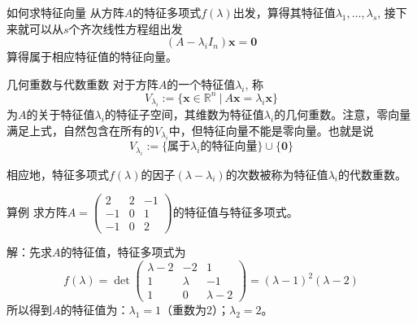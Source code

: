 \documentclass[10pt]{beamer}
\begin{document}

\begin{frame}

\begin{block}{如何求特征向量}
从方阵$A$的特征多项式$f(\lambda)$出发，算得其特征值$\lambda_1, \ldots, \lambda_s$, 接下来就可以从$s$个齐次线性方程组出发
$$(A - \lambda_i I_n)\mathbf{x} = \mathbf{0}$$
算得属于相应特征值的特征向量。
\end{block}

\end{frame}


\begin{frame}

\begin{block}{几何重数与代数重数}
对于方阵$A$的一个特征值$\lambda_i$, 称
$$V_{\lambda_i} := \{ \mathbf{x} \in \mathbb{R}^n \ |\ A\mathbf{x} = \lambda_i\mathbf{x} \}$$
为$A$的关于特征值$\lambda_i$的特征子空间，其维数为特征值$\lambda_i$的几何重数。注意，零向量满足上式，自然包含在所有的$V_{\lambda_i}$中，但特征向量不能是零向量。也就是说
$$V_{\lambda_i} := \{ \text{属于$\lambda_i$的特征向量} \} \cup \{\mathbf{0}\}$$

\vspace{1em}
\pause

相应地，特征多项式$f(\lambda)$的因子$(\lambda - \lambda_i)$的次数被称为特征值$\lambda_i$的代数重数。
\end{block}

\end{frame}


\begin{frame}

\begin{block}{算例}
求方阵$A = \begin{pmatrix} 2 & 2 & -1 \\ -1 & 0 & 1 \\ -1 & 0 & 2 \end{pmatrix}$的特征值与特征多项式。

\vspace{1em}
\pause

解：先求$A$的特征值，特征多项式为
$$
f(\lambda) = \det \begin{pmatrix} \lambda-2 & -2 & 1 \\ 1 & \lambda & -1 \\ 1 & 0 & \lambda-2 \end{pmatrix} = (\lambda-1)^2(\lambda-2)
$$
所以得到$A$的特征值为：$\lambda_1=1$（重数为2）；$\lambda_2=2$。
\end{block}

\end{frame}
\end{document}
